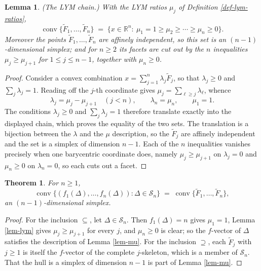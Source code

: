 \documentclass[11pt, a4paper, abstract=yes]{scrartcl}
\theoremstyle{definition}
\theoremstyle{remark}
\theoremstyle{plain}
\newtheorem{lemma}[definition]{Lemma}
\newtheorem{theorem}[definition]{Theorem}
\newcommand{\conv}{\operatorname{conv}}
\begin{document}
\begin{lemma}
(\emph{The LYM chain.}) With the LYM ratios \(\mu_j\) of Definition \ref{def-lym-ratios},
\begin{equation}\label{eq:mu}
  \conv\lbrace\tilde F_1,\dots,\tilde F_n\rbrace
  \;=\;\lbrace x\in\mathbb R^n:\ \mu_1=1\ge\mu_2\ge\cdots\ge\mu_n\ge0\rbrace .
\end{equation}
Moreover the points \(\tilde F_1,\dots,\tilde F_n\) are affinely independent, so this set is an
\((n-1)\)-dimensional simplex; and for \(n\ge2\) its facets are cut out by the \(n\) inequalities
\(\mu_j\ge\mu_{j+1}\) for \(1\le j\le n-1\), together with \(\mu_n\ge0\).
\label{lem:mu}
\label{lem-mu}
\end{lemma}

\begin{proof}
Consider a convex combination \(x=\sum_{j=1}^n\lambda_j\tilde F_j\), so that \(\lambda_j\ge0\) and
\(\sum_j\lambda_j=1\). Reading off the \(j\)-th coordinate gives \(\mu_j=\sum_{\ell\ge j}\lambda_\ell\),
whence
\begin{equation}\label{eq:mu-2}
  \lambda_j=\mu_j-\mu_{j+1}\quad(j<n),\qquad \lambda_n=\mu_n,\qquad \mu_1=1 .
\end{equation}
The conditions \(\lambda_j\ge0\) and \(\sum_j\lambda_j=1\) therefore translate exactly into the
displayed chain, which proves the equality of the two sets. The translation is a bijection between
the \(\lambda\) and the \(\mu\) description, so the \(\tilde F_j\) are affinely independent and the
set is a simplex of dimension \(n-1\). Each of the \(n\) inequalities vanishes precisely when one
barycentric coordinate does, namely \(\mu_j\ge\mu_{j+1}\) on \(\lambda_j=0\) and \(\mu_n\ge0\) on
\(\lambda_n=0\), so each cuts out a facet.
\end{proof}

\begin{theorem}
\textcite[Theorem 4.1]{Kozlov1997} For \(n\ge1\),
\begin{equation}\label{eq:kozlov}
  \conv\bigl\lbrace(f_1(\Delta),\dots,f_n(\Delta)):\Delta\in\mathcal S_n\bigr\rbrace
  \;=\;\conv\lbrace\tilde F_1,\dots,\tilde F_n\rbrace,
\end{equation}
an \((n-1)\)-dimensional simplex.
\label{thm:kozlov}
\label{thm-kozlov}
\end{theorem}

\begin{proof}
For the inclusion \(\subseteq\), let \(\Delta\in\mathcal S_n\). Then \(f_1(\Delta)=n\) gives
\(\mu_1=1\), Lemma \ref{lem-lym} gives \(\mu_j\ge\mu_{j+1}\) for every \(j\), and \(\mu_n\ge0\) is
clear; so the \(f\)-vector of \(\Delta\) satisfies the description of Lemma \ref{lem-mu}. For the
inclusion \(\supseteq\), each \(\tilde F_j\) with \(j\ge1\) is itself the \(f\)-vector of the complete
\(j\)-skeleton, which is a member of \(\mathcal S_n\). That the hull is a simplex of dimension
\(n-1\) is part of Lemma \ref{lem-mu}.
\end{proof}
\end{document}
